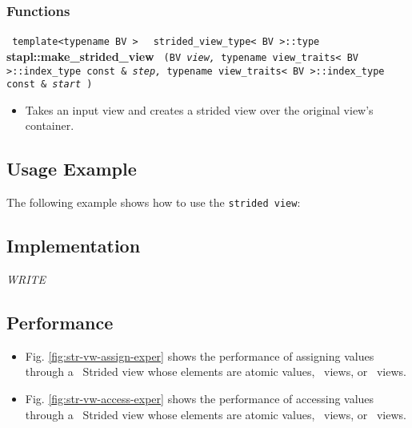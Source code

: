 \subsubsection{Functions}

\noindent
\texttt{%
template<typename BV >
}
\texttt{%
strided\_view\_type< BV >::type
}
\newline
\textbf{stapl::make\_strided\_view}%
\texttt{%
(BV
\textit{view,}%
typename view\_traits< BV >::index\_type const \&
\textit{step,}%
typename view\_traits< BV >::index\_type const \&
\textit{start}%
)
}

\begin{itemize}
\item
Takes an input view and creates a strided view over the original view's container.
\end{itemize}

\subsection{Usage Example} \label{sec-str-vw-use}

The following example shows how to use the \texttt{strided view}:


\subsection{Implementation} \label{sec-str-vw-impl}

\textit{WRITE}

\subsection{Performance} \label{sec-str-vw-perf}

\begin{itemize}
\item
Fig. \ref{fig:str-vw-assign-exper}
shows the performance of assigning values through a \stapl\ Strided view
whose elements are atomic values, \stl\ views, or \stapl\ views.
\item
Fig. \ref{fig:str-vw-access-exper}
shows the performance of accessing values through a \stapl\ Strided view
whose elements are atomic values, \stl\ views, or \stapl\ views.
\end{itemize}

